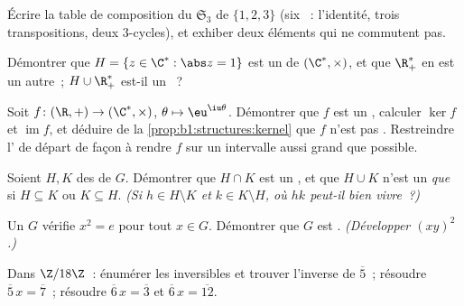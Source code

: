 \begin{exercise}[$\star$]\label{exo:b1:structures:3}
Écrire la table de composition du  $\mathfrak{S}_3$
de $\{1,2,3\}$ (six ~: l'identité, trois transpositions, deux
$3$-cycles), et exhiber deux éléments qui ne commutent pas.
\end{exercise}

\begin{exercise}[$\star$]\label{exo:b1:structures:4}
Démontrer que $H = \{z \in \C^* : \abs z = 1\}$ est un  de
$(\C^*, \times)$, et que $\R_+^*$ en est un autre~; $H \cup \R_+^*$
est-il un ~?
\end{exercise}

\begin{exercise}[$\star\star$]\label{exo:b1:structures:5}
Soit $f \colon (\R, +) \to (\C^*, \times)$, $\theta \mapsto
\eu^{\iu\theta}$. Démontrer que $f$ est un , calculer $\ker f$
et $\operatorname{im} f$, et déduire de
la \cref{prop:b1:structures:kernel} que $f$ n'est pas . Restreindre
l' de départ de façon à rendre $f$  sur un intervalle
aussi grand que possible.
\end{exercise}

\begin{exercise}[$\star\star$]\label{exo:b1:structures:6}
Soient $H, K$ des  de $G$. Démontrer que $H \cap K$ est un
, et que $H \cup K$ n'est un  \emph{que} si
$H \subseteq K$ ou $K \subseteq H$. \emph{(Si $h \in H \setminus K$ et
$k \in K \setminus H$, où $hk$ peut-il bien vivre~?)}
\end{exercise}

\begin{exercise}[$\star\star$]\label{exo:b1:structures:7}
Un  $G$ vérifie $x^2 = e$ pour tout $x \in G$. Démontrer que $G$
est . \emph{(Développer $(xy)^2$.)}
\end{exercise}

\begin{exercise}[$\star\star$]\label{exo:b1:structures:8}
Dans $\Z/18\Z$~: énumérer les inversibles et trouver l'inverse de
$\overline 5$~; résoudre $\overline 5\, x = \overline 7$~; résoudre
$\overline 6\, x = \overline 3$ et $\overline 6\, x = \overline{12}$.
\end{exercise}

